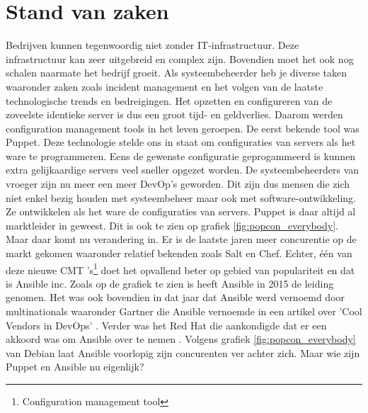 \section{Stand van zaken}
\label{sec:stand-van-zaken}
Bedrijven kunnen tegenwoordig niet zonder IT-infrastructuur. Deze infrastructuur kan zeer uitgebreid en complex zijn. Bovendien moet het ook nog schalen naarmate het bedrijf groeit. Als systeembeheerder heb je diverse taken waaronder zaken zoals incident management en het volgen van de laatste technologische trends en bedreigingen. Het opzetten en configureren van de zoveelste identieke server is dus een groot tijd- en geldverlies. Daarom werden configuration management tools in het leven geroepen. De eerst bekende tool was Puppet. Deze technologie stelde ons in staat om configuraties van servers als het ware te programmeren. Eens de gewenste configuratie geprogammeerd is kunnen extra gelijkaardige servers veel sneller opgezet worden. De systeembeheerders van vroeger zijn nu meer een meer DevOp's geworden. Dit zijn dus mensen die zich niet enkel bezig houden met systeembeheer maar ook met software-ontwikkeling. Ze ontwikkelen als het ware de configuraties van servers. Puppet is daar altijd al marktleider in geweest. Dit is ook te zien op grafiek \ref{fig:popcon_everybody}. Maar daar komt nu verandering in. Er is de laatste jaren meer concurentie op de markt gekomen waaronder relatief bekenden zoals Salt en Chef. 
Echter,  \'e\'en van deze nieuwe CMT 's\footnote{Configuration management tool} doet het opvallend beter op gebied van populariteit en dat is Ansible inc. Zoals op de grafiek te zien is heeft Ansible in 2015 de leiding genomen. Het was ook bovendien in dat jaar dat Ansible werd vernoemd door multinationals waaronder Gartner die Ansible vernoemde in een artikel over  'Cool Vendors in DevOps' \autocite{coolvendors}. Verder was het Red Hat die aankondigde dat er een akkoord was om Ansible over te nemen \autocite{redhatovername}. Volgens grafiek  \ref{fig:popcon_everybody} van Debian laat Ansible voorlopig zijn concurenten ver achter zich. Maar wie zijn Puppet en Ansible nu eigenlijk?

